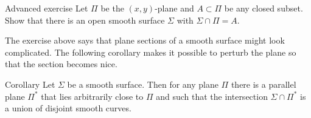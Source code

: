 \begin{thm}{Advanced exercise}\label{ex:plane-section}
Let $\Pi$ be the $(x,y)$-plane and $A \subset \Pi$ be any closed subset. Show that there is an open smooth surface $\Sigma$ with $\Sigma \cap \Pi = A$.
\end{thm}

The exercise above says that plane sections of a smooth surface might look complicated.
The following corollary makes it possible to perturb the plane so that the section becomes nice.

\begin{thm}{Corollary}
Let $\Sigma$ be a smooth surface.
Then for any plane $\Pi$ there is a parallel plane $\Pi^{*}$ that lies arbitrarily close to $\Pi$ and such that the intersection $\Sigma\cap\Pi^{*}$ is a union of disjoint smooth curves.
\end{thm}




